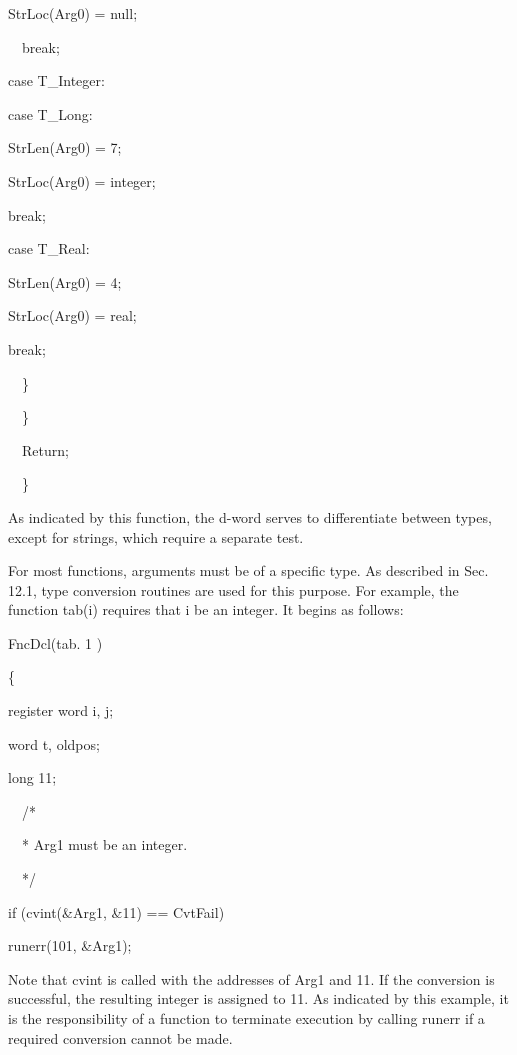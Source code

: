 {\ttfamily\mdseries
StrLoc(Arg0) = {\textquotedbl}null{\textquotedbl};}

{\ttfamily\mdseries
\ \ break;}

{\ttfamily\mdseries
case T\_Integer:}

{\ttfamily\mdseries
case T\_Long:}

{\ttfamily\mdseries
StrLen(Arg0) = 7;}

{\ttfamily\mdseries
StrLoc(Arg0) = {\textquotedbl}integer{\textquotedbl};}

{\ttfamily\mdseries
break;}

{\ttfamily\mdseries
case T\_Real:}

{\ttfamily\mdseries
StrLen(Arg0) = 4;}

{\ttfamily\mdseries
StrLoc(Arg0) = {\textquotedbl}real{\textquotedbl};}

{\ttfamily\mdseries
break;}

{\ttfamily\mdseries
\ \ \}}

{\ttfamily\mdseries
\ \ \}}

{\ttfamily\mdseries
\ \ Return;}

{\ttfamily\mdseries
\ \ \}}


As indicated by this function, the d-word serves to differentiate
between types, except for strings, which require a separate test.


For most functions, arguments must be of a specific type. As described
in Sec. 12.1, type conversion routines are used for this purpose. For
example, the function tab(i) requires that i be an integer. It begins
as follows:

{\ttfamily\mdseries
FncDcl(tab. 1 )}

{\ttfamily\mdseries
\{}

{\ttfamily\mdseries
register word i, j;}

{\ttfamily\mdseries
word t, oldpos;}

{\ttfamily\mdseries
long 11;}

{\ttfamily\mdseries
\ \ /*}

{\ttfamily\mdseries
\ \ * Arg1 must be an integer.}

{\ttfamily\mdseries
\ \ */}

{\ttfamily\mdseries
if (cvint(\&Arg1, \&11) == CvtFail)}

{\ttfamily\mdseries
runerr(101, \&Arg1);}


Note that cvint is called with the addresses of Arg1 and 11. If the
conversion is successful, the resulting integer is assigned to 11. As
indicated by this example, it is the responsibility of a function to
terminate execution by calling runerr if a required conversion cannot
be made.


